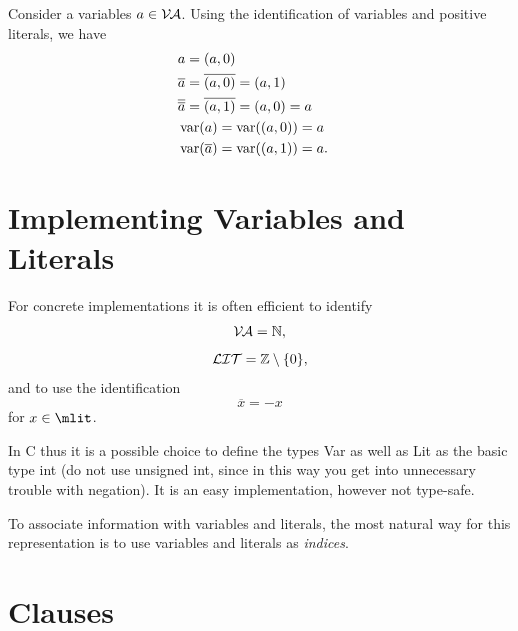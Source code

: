 \documentclass[12pt]{book}
\begin{document}
\begin{examp}\label{}
Consider a variables $a\in  \mathcal{V\hspace{-0.1em}A}$. Using the identification of variables and positive literals, we have
\begin{eqnarray*}
&a = (a,0)& \\
&\overline{a} = \overline{(a,0)} = (a,1)&\\
&\overline{\overline{a}} = \overline{(a,1)} = (a,0) = a&\\
&\operatorname{var}(a) = \operatorname{var}((a,0)) = a& \\
&\operatorname{var}(\overline{a}) = \operatorname{var}((a,1)) = a. &
\end{eqnarray*}
\end{examp}
\section{Implementing Variables and Literals}
\label{sec:varlit}
For concrete implementations it is often efficient to identify
\begin{displaymath}
   \mathcal{V\hspace{-0.1em}A} = \mathbb{N},
\end{displaymath}
\begin{displaymath}
  \mathcal{LIT} = \mathbb{Z}\setminus \{0\}, 
\end{displaymath}
and to use the identification
\begin{displaymath}
 \overline{x} = -x
\end{displaymath}
for $x \in \mlit$.

In C thus it is a possible choice to define the types Var as well as Lit as the basic type int (do not use unsigned int, since in this way you get into unnecessary trouble with negation). It is an easy implementation, however not type-safe.

To associate information with variables and literals, the most natural way for this representation is to use variables and literals as \textit{indices}.

\section{Clauses}
\label{sec:Clauses}
\end{document}
